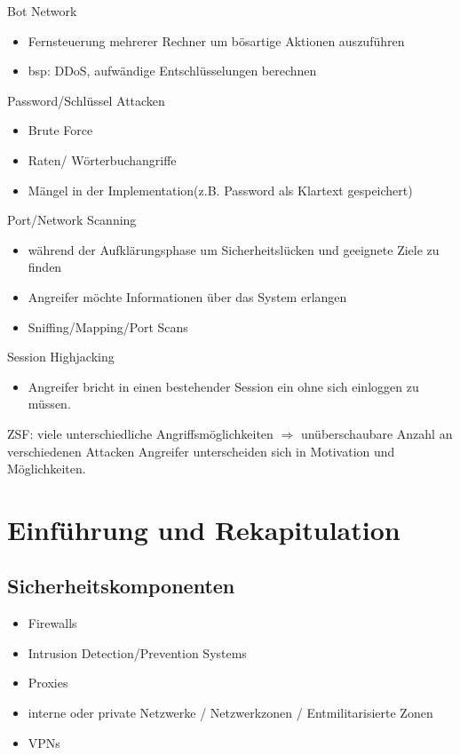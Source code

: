 \documentclass{article} %
\begin{document}
Bot Network
\begin{itemize}
	\item Fernsteuerung mehrerer Rechner um bösartige Aktionen auszuführen
    \item bsp: DDoS, aufwändige Entschlüsselungen berechnen
\end{itemize}
Password/Schlüssel Attacken
\begin{itemize}
	\item Brute Force
    \item Raten/ Wörterbuchangriffe
    \item Mängel in der Implementation(z.B. Password als Klartext gespeichert)
\end{itemize}
Port/Network Scanning

\begin{itemize}
	\item während der Aufklärungsphase um Sicherheitslücken und geeignete Ziele zu finden
    \item Angreifer möchte Informationen über das System erlangen
    \item Sniffing/Mapping/Port Scans
\end{itemize}
Session Highjacking
\begin{itemize}
	\item Angreifer bricht in einen bestehender Session ein ohne sich einloggen zu müssen.
\end{itemize}

ZSF: viele unterschiedliche Angriffsmöglichkeiten $\Rightarrow$ unüberschaubare Anzahl an verschiedenen Attacken
Angreifer unterscheiden sich in Motivation und Möglichkeiten.


\section{Einführung und Rekapitulation}
\subsection{Sicherheitskomponenten}
\begin{itemize}
	\item Firewalls
    \item Intrusion Detection/Prevention Systems
    \item Proxies
    \item interne oder private Netzwerke / Netzwerkzonen / Entmilitarisierte Zonen
    \item VPNs
\end{itemize}
\end{document}
